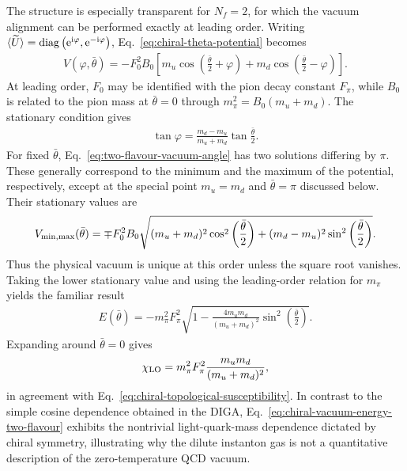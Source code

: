 \documentclass[review]{elsarticle}
\numberwithin{equation}{section}
\numberwithin{table}{section}
\numberwithin{figure}{section}
\def\i{\mathrm{i}}
\def\e{\mathrm{e}}
\begin{document}
The structure is especially transparent for $N_f=2$, for which the vacuum alignment can be performed exactly at leading order. Writing
$\langle\widetilde U\rangle={\rm diag}
\left(\e^{\i\varphi},\e^{-\i\varphi}\right)$,
Eq.~\eqref{eq:chiral-theta-potential} becomes
\begin{align}
    V(\varphi,\bar\theta)
    = -F^2_0 B_0 \left[m_u \cos\left(\frac{\bar\theta}{2}+\varphi \right) + m_d\cos\left(\frac{\bar\theta}{2}-\varphi \right) \right].
    \label{eq:two-flavour-potential}
\end{align}
At leading order, $F_0$ may be identified with the pion decay constant $F_\pi$, while $B_0$ is related to the pion mass at $\bar\theta=0$ through $m_\pi^2=B_0(m_u+m_d)$. The stationary condition gives
\begin{align}
    \tan\varphi = \frac{m_d-m_u}{m_u+m_d} \tan\frac{\bar\theta}{2}.
    \label{eq:two-flavour-vacuum-angle}
\end{align}
For fixed $\bar\theta$, Eq.~\eqref{eq:two-flavour-vacuum-angle} has two solutions differing by $\pi$. These generally correspond to the minimum and the maximum of the potential, respectively, except at the special point $m_u=m_d$ and $\bar\theta=\pi$ discussed below. Their stationary values are
\begin{align}
    V_{\rm min,max}(\bar\theta) 
    =
    \mp F_0^2B_0 \sqrt{ (m_u+m_d)^2 \cos^2\left(\frac{\bar\theta}{2}\right) + (m_d-m_u)^2 \sin^2\left(\frac{\bar\theta}{2}\right) }.
\end{align}
Thus the physical vacuum is unique at this order unless the square root vanishes. Taking the lower stationary value and using the leading-order relation for $m_\pi$ yields the familiar result~\cite{DiVecchia:1980yfw,GrilliDiCortona:2015jxo}
\begin{align}
    E(\bar\theta) = -m_\pi^2F_\pi^2
    \sqrt{ 1- \frac{4m_um_d}{(m_u+m_d)^2} \sin^2\left(\frac{\bar\theta}{2}\right)}.
    \label{eq:chiral-vacuum-energy-two-flavour}
\end{align}
Expanding around $\bar\theta=0$ gives
\begin{align}
    \chi_{\rm LO} = m_\pi^2F_\pi^2 \frac{m_um_d}{(m_u+m_d)^2},
    \label{eq:two-flavour-susceptibility}
\end{align}
in agreement with Eq.~\eqref{eq:chiral-topological-susceptibility}. In contrast to the simple cosine dependence obtained in the DIGA, Eq.~\eqref{eq:chiral-vacuum-energy-two-flavour} exhibits the nontrivial light-quark-mass dependence dictated by chiral symmetry, illustrating why the dilute instanton gas is not a quantitative description of the zero-temperature QCD vacuum.
\end{document}

